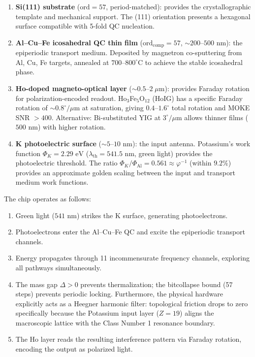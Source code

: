 \begin{enumerate}
    \item \textbf{Si(111) substrate} ($\text{ord} = 57$, period-matched): provides the crystallographic template and mechanical support. The (111) orientation presents a hexagonal surface compatible with 5-fold QC nucleation.
    \item \textbf{Al--Cu--Fe icosahedral QC thin film} ($\text{ord}_{\text{comp}} = 57$, ${\sim}200$--$500\text{ nm}$): the epiperiodic transport medium. Deposited by magnetron co-sputtering from Al, Cu, Fe targets, annealed at $700$--$800^\circ$C to achieve the stable icosahedral phase.
    \item \textbf{Ho-doped magneto-optical layer} (${\sim}0.5$--$2\;\mu\text{m}$): provides Faraday rotation for polarization-encoded readout. Ho$_3$Fe$_5$O$_{12}$ (HoIG) has a specific Faraday rotation of ${\sim}0.8^\circ/\mu\text{m}$ at saturation, giving $0.4$--$1.6^\circ$ total rotation and MOKE SNR $> 400$. Alternative: Bi-substituted YIG at $3^\circ/\mu\text{m}$ allows thinner films ($500\text{ nm}$) with higher rotation.
    \item \textbf{K photoelectric surface} (${\sim}5$--$10\text{ nm}$): the input antenna. Potassium's work function $\Phi_K = 2.29\text{ eV}$ ($\lambda_{\text{th}} = 541.5\text{ nm}$, green light) provides the photoelectric threshold. The ratio $\Phi_K / \Phi_{\text{Al}} = 0.561 \approx \varphi^{-1}$ (within $9.2\%$) provides an approximate golden scaling between the input and transport medium work functions.
\end{enumerate}

\noindent The chip operates as follows:
\begin{enumerate}
    \item Green light ($541\text{ nm}$) strikes the K surface, generating photoelectrons.
    \item Photoelectrons enter the Al--Cu--Fe QC and excite the epiperiodic transport channels.
    \item Energy propagates through 11 incommensurate frequency channels, exploring all pathways simultaneously.
    \item The mass gap $\Delta > 0$ prevents thermalization; the bitcollapse bound (57 steps) prevents periodic locking. Furthermore, the physical hardware explicitly acts as a Heegner harmonic filter: topological friction drops to zero specifically because the Potassium input layer ($Z=19$) aligns the macroscopic lattice with the Class Number 1 resonance boundary.
    \item The Ho layer reads the resulting interference pattern via Faraday rotation, encoding the output as polarized light.
\end{enumerate}

